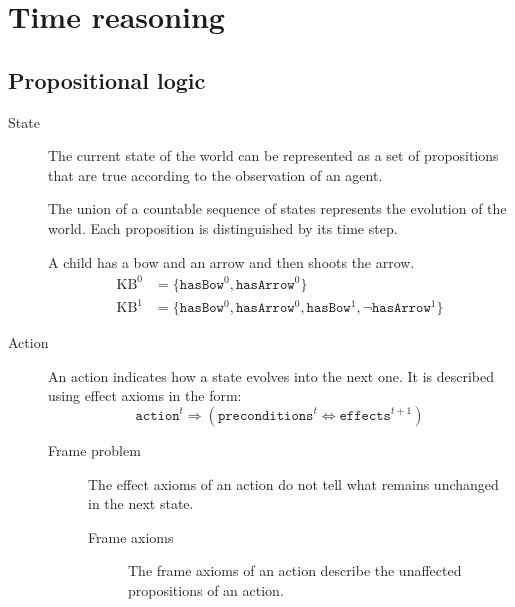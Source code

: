 \chapter{Time reasoning}


\section{Propositional logic}

\begin{description}
    \item[State]  
        The current state of the world can be represented as a set of propositions that are true according to the observation of an agent.

        The union of a countable sequence of states represents the evolution of the world. Each proposition is distinguished by its time step.

        \begin{example}
            A child has a bow and an arrow and then shoots the arrow.
            \[
                \begin{split}
                    \text{KB}^0 &= \{ \texttt{hasBow}^0, \texttt{hasArrow}^0  \} \\
                    \text{KB}^1 &= \{ \texttt{hasBow}^0, \texttt{hasArrow}^0, \texttt{hasBow}^1, \lnot\texttt{hasArrow}^1  \} 
                \end{split}
            \]
        \end{example}

    \item[Action] 
        An action indicates how a state evolves into the next one.
        It is described using effect axioms in the form:
        \[ \texttt{action}^t \Rightarrow (\texttt{preconditions}^t \iff \texttt{effects}^{t+1}) \]

        \begin{description}
            \item[Frame problem] 
                The effect axioms of an action do not tell what remains unchanged in the next state.

            \begin{description}
                \item[Frame axioms] 
                    The frame axioms of an action describe the unaffected propositions of an action.
            \end{description}
        \end{description}


\end{description}
